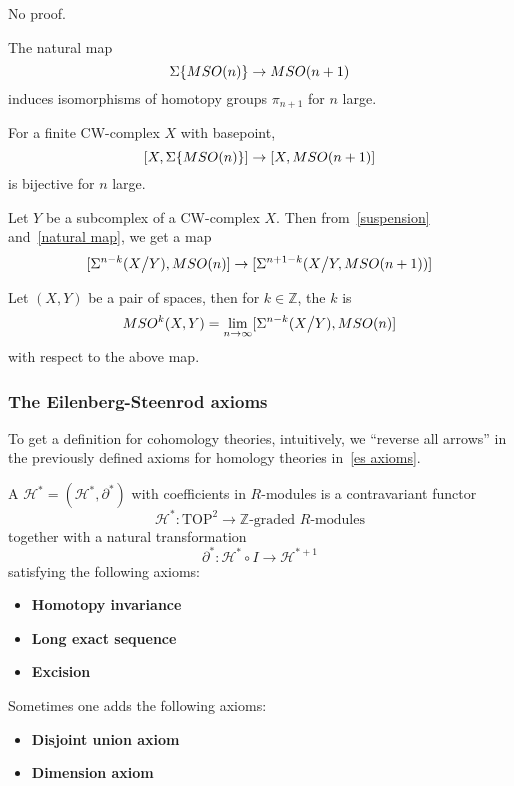 \documentclass[a4paper,11pt]{article}
\begin{document}
\begin{theorem}\label{freudenthal}
\end{theorem}

No proof.

\begin{lemma}\label{natural map}\cite{thom}
    The natural map
    \[\Sigma\{MSO(n)\}\to MSO(n+1)\]
    induces isomorphisms of homotopy groups \(\pi_{n+1}\) for \(n\) large.
\end{lemma}

\begin{corollary}
    For a finite CW-complex \(X\) with basepoint, \[[X,\Sigma\{MSO(n)\}]\to[X,MSO(n+1)]\] is bijective for \(n\) large.
\end{corollary}

\begin{lemma}
    Let \(Y\) be a subcomplex of a CW-complex \(X\). Then from\ \ref{suspension} and\ \ref{natural map}, we get a map
    \[[\Sigma^{n-k}(X\big/ Y),MSO(n)]\to[\Sigma^{n+1-k}(X\big/Y, MSO(n+1))]\]
\end{lemma}

\begin{definition}
    Let \((X,Y)\) be a pair of spaces, then for \(k\in\mathbb{Z}\), the \(k\) is
    \[MSO^k(X,Y)=\lim_{n\to\infty}[\Sigma^{n-k}(X\big/Y),MSO(n)]\]
    with respect to the above map.
\end{definition}

\subsubsection{The Eilenberg-Steenrod axioms}
To get a definition for cohomology theories, intuitively, we \enquote{reverse all arrows} in the previously defined axioms for homology theories in\ \ref{es axioms}.

\begin{definition}
    A  \(\mathcal{H}^\ast=(\mathcal{H}^\ast,\partial^\ast)\) with coefficients in \(R\)-modules is a contravariant functor \[\mathcal{H}^\ast:\mathrm{TOP}^2\to\mathbb{Z}\text{-graded }R\text{-modules}\] together with a natural transformation \[\partial^\ast:\mathcal{H}^\ast\circ I\to\mathcal{H}^{\ast+1}\] satisfying the following axioms:
    \begin{itemize}
        \item \textbf{Homotopy invariance}
        \item \textbf{Long exact sequence}
        \item \textbf{Excision}
    \end{itemize}
    Sometimes one adds the following axioms:
    \begin{itemize}
        \item \textbf{Disjoint union axiom}
        \item \textbf{Dimension axiom}
    \end{itemize}
\end{definition}
\end{document}
